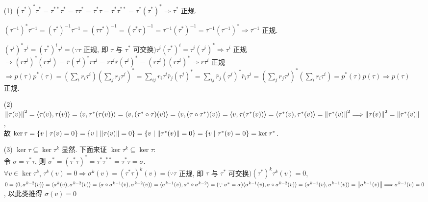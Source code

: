 \documentclass{note}
\begin{document}
\begin{pf}
    \begin{itemize}
        \item[(1)] $(\tau^*)^*\tau^*=\tau^{**}\tau^*=\tau\tau^*=\tau^*\tau=\tau^*\tau^{**}=\tau^*(\tau^*)^*\Longrightarrow\tau^*$ 正规.

        $(\tau^{-1})^*\tau^{-1}=(\tau^*)^{-1}\tau^{-1}=(\tau\tau^*)^{-1}=(\tau^*\tau)^{-1}=\tau^{-1}(\tau^*)^{-1}=\tau^{-1}(\tau^{-1})^*\Longrightarrow\tau^{-1}$ 正规.

        $(\tau^i)^*\tau^i=(\tau^*)^i\tau^i=(\because\tau$ 正规, 即 $\tau$ 与 $\tau^*$ 可交换$)\tau^i(\tau^*)^i=\tau^i(\tau^i)^*\Longrightarrow\tau^i$ 正规\\
        $\Longrightarrow(r\tau^i)^*(r\tau^i)=\bar{r}(\tau^i)^*r\tau^i=r\tau^i\bar{r}(\tau^i)^*=(r\tau^i)(r\tau^i)^*\Longrightarrow r\tau^i$ 正规\\
        $\Longrightarrow p(\tau)p^*(\tau)=\left(\sum_ir_i\tau^i\right)\left(\sum_jr_j\tau^j\right)^*=\sum_{ij}r_i\tau^i\bar{r}_j(\tau^j)^*=\sum_{ij}\bar{r}_j(\tau^j)^*\bar{r}_i\tau^i=\left(\sum_jr_j\tau^j\right)^*\left(\sum_ir_i\tau^i\right)=p^*(\tau)p(\tau)\Longrightarrow p(\tau)$ 正规.
        \item[(2)] $\left\lVert\tau(v)\right\rVert^2=\langle\tau(v),\tau(v)\rangle=\langle v,\tau^*(\tau(v))\rangle=\langle v,(\tau^*\circ\tau)(v)\rangle=\langle v,(\tau\circ\tau^*)(v)\rangle=\langle v,\tau(\tau^*(v))\rangle=\langle\tau^*(v),\tau^*(v)\rangle=\left\lVert\tau^*(v)\right\rVert^2\Longrightarrow\left\lVert\tau(v)\right\rVert^2=\left\lVert\tau^*(v)\right\rVert$,\\
        故 $\ker\tau=\{v\mid\tau(v)=0\}=\{v\mid\left\lVert\tau(v)\right\rVert=0\}=\{v\mid\left\lVert\tau^*(v)\right\rVert=0\}=\{v\mid\tau^*(v)=0\}=\ker\tau^*$.
        \item[(3)] $\ker\tau\subseteq\ker\tau^k$ 显然. 下面来证 $\ker\tau^k\subseteq\ker\tau$:\\
        令 $\sigma=\tau^*\tau$, 则 $\sigma^*=(\tau^*\tau)^*=\tau^*\tau^{**}=\tau^*\tau=\sigma$.\\
        $\forall v\in\ker\tau^k$, $\tau^k(v)=0\Longrightarrow\sigma^k(v)=(\tau^*\tau)^k(v)=(\because\tau$ 正规, 即 $\tau$ 与 $\tau^*$ 可交换$)(\tau^*)^k\tau^k(v)=0$,\\
        $0=\langle 0,\sigma^{k-2}(v)\rangle=\langle\sigma^k(v),\sigma^{k-2}(v)\rangle=\langle\sigma\circ\sigma^{k-1}(v),\sigma^{k-2}(v)\rangle=\langle\sigma^{k-1}(v),\sigma^*\circ\sigma^{k-2}\rangle=(\because\sigma^*=\sigma)\langle\sigma^{k-1}(v),\sigma\circ\sigma^{k-2}(v)\rangle=\langle\sigma^{k-1}(v),\sigma^{k-1}(v)\rangle=\left\lVert\sigma^{k-1}(v)\right\rVert\Longrightarrow\sigma^{k-1}(v)=0$, 以此类推得 $\sigma(v)=0$\\

\end{itemize}
\end{pf}
\end{document}
